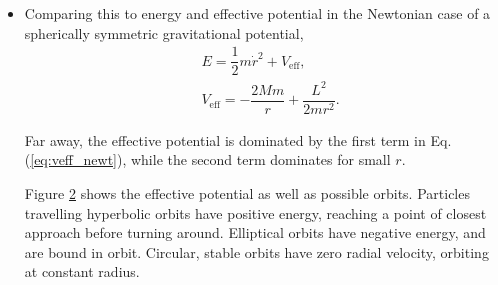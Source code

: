 \documentclass[10pt]{article}
\begin{document}
\begin{itemize}
\item
Comparing this to energy and effective potential in the Newtonian case of a spherically symmetric gravitational potential,
\begin{align}
&E = \dfrac{1}{2}m\dot{r}^2 + V_\text{eff},
\\
&V_\text{eff} = -\dfrac{2Mm}{r} + \dfrac{L^2}{2mr^2}.
\label{eq:veff_newt}
\end{align}


Far away, the effective potential is dominated by the first term in Eq.(\ref{eq:veff_newt}), while the second term dominates for small $r$. 

Figure \ref{fig:veff_newt} shows the effective potential as well as possible orbits.
Particles travelling hyperbolic orbits have positive energy, reaching a point of closest approach before turning around.
Elliptical orbits have negative energy, and are bound in orbit.
Circular, stable orbits have zero radial velocity, orbiting at constant radius.

\begin{figure}[h]
\centering
\label{fig:veff}
\begin{subfigure}{0.5\textwidth} \label{fig:veff_newt}
\centering




\begin{tikzpicture}[x=0.75pt,y=0.75pt,yscale=-1,xscale=1]


\end{tikzpicture}
\end{subfigure}
\end{figure}
\end{itemize}
\end{document}
